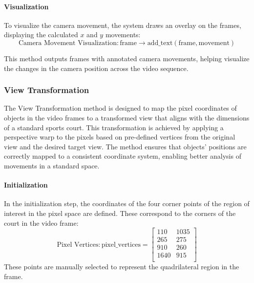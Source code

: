 \paragraph{Visualization}
To visualize the camera movement, the system draws an overlay on the frames, displaying the calculated $x$ and $y$ movements:
\begin{equation}
    \text{Camera Movement Visualization:} \, \text{frame} \rightarrow \text{add\_text}(\text{frame}, \text{movement})
\end{equation}

This method outputs frames with annotated camera movements, helping visualize the changes in the camera position across the video sequence.



\subsubsection{View Transformation}
The View Transformation method is designed to map the pixel coordinates of objects in the video frames to a transformed view that aligns with the dimensions of a standard sports court. This transformation is achieved by applying a perspective warp to the pixels based on pre-defined vertices from the original view and the desired target view. The method ensures that objects' positions are correctly mapped to a consistent coordinate system, enabling better analysis of movements in a standard space.

\paragraph{Initialization}
In the initialization step, the coordinates of the four corner points of the region of interest in the pixel space are defined. These correspond to the corners of the court in the video frame:
\begin{equation}
    \text{Pixel Vertices:} \, \text{pixel\_vertices} = 
    \left[\begin{matrix} 
    110 & 1035 \\
    265 & 275 \\
    910 & 260 \\
    1640 & 915 \\
    \end{matrix}\right]
\end{equation}
These points are manually selected to represent the quadrilateral region in the frame.

